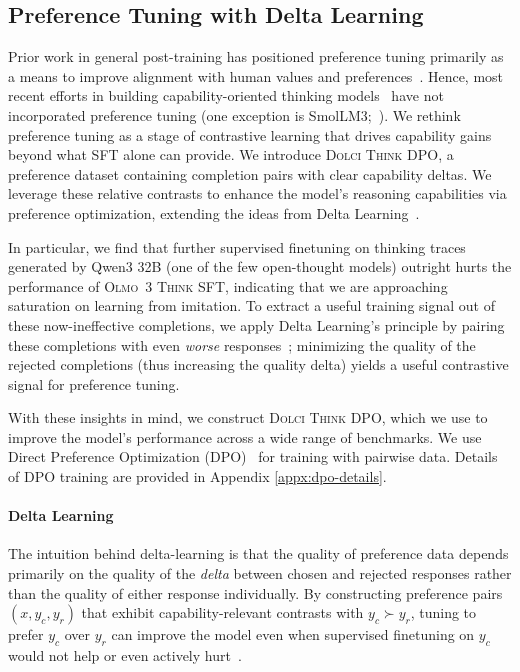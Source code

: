 \documentclass[table]{ai2style/ai2}
\newcommand{\olmothreethinkingsft}{\textsc{Olmo~3 Think SFT}\xspace}
\newcommand{\dolcithinkdpo}{\textsc{Dolci Think DPO}\xspace}
\begin{document}
\subsection{Preference Tuning with Delta Learning} \label{sec:thinking_dpo_recipe}
Prior work in general post-training has positioned preference tuning primarily as a means to improve alignment with human values and preferences~\citep{lambert2024tulu3, rlhf2024}. Hence, most recent efforts in building capability-oriented thinking models~\citep{guha2025openthoughts,ahmad2025opencodereasoning} have not incorporated preference tuning (one exception is SmolLM3;~\cite{bakouch2025smollm3}). We rethink preference tuning as a stage of contrastive learning that drives capability gains beyond what SFT alone can provide. We introduce \dolcithinkdpo, a preference dataset containing completion pairs with clear capability deltas. We leverage these relative contrasts to enhance the model’s reasoning capabilities via preference optimization, extending the ideas from Delta Learning~\citep{geng2025delta}.

In particular, we find that further supervised finetuning on thinking traces generated by Qwen3 32B (one of the few open-thought models) outright hurts the performance of \olmothreethinkingsft, indicating that we are approaching saturation on learning from imitation. To extract a useful training signal out of these now-ineffective completions, we apply Delta Learning's principle by pairing these completions with even \textit{worse} responses~\citep{geng2025delta}; minimizing the quality of the rejected completions (thus increasing the quality delta) yields a useful contrastive signal for preference tuning.

With these insights in mind, we construct \dolcithinkdpo, which we use to improve the model’s performance across a wide range of benchmarks.
We use Direct Preference Optimization (DPO)~\citep{rafailov2024direct} for training with pairwise data.
Details of DPO training are provided in Appendix \ref{appx:dpo-details}.

\paragraph{Delta Learning}
The intuition behind delta-learning is that the quality of preference data depends primarily on the quality of the \textit{delta} between chosen and rejected responses rather than the quality of either response individually.
By constructing preference pairs $(x, y_c, y_r)$ that exhibit capability-relevant contrasts with $y_c \succ y_r$,
tuning to prefer $y_c$ over $y_r$ can improve the model even when supervised finetuning on $y_c$ would not help or even actively hurt~\citep{geng2025delta, d2025anchored, kim2025systematic}.
\end{document}
